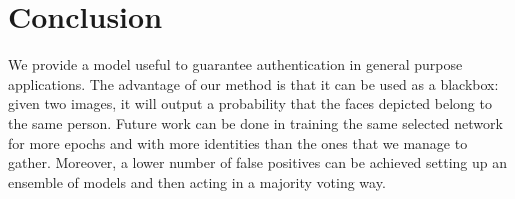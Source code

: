 \section{Conclusion}
We provide a model useful to guarantee authentication in general purpose applications. The advantage of our method is that it can be used as a blackbox: given two images, it will output a probability that the faces depicted belong to the same person.
Future work can be done in training the same selected network for more epochs and with more identities than the ones that we manage to gather. Moreover, a lower number of false positives can be achieved setting up an ensemble of models and then acting in a majority voting way.
